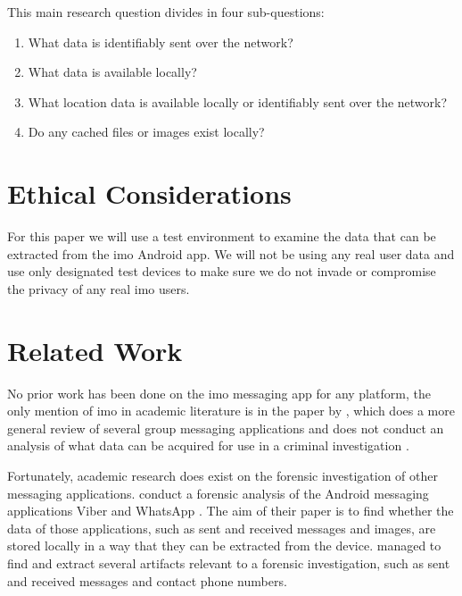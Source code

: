 \documentclass[conference]{IEEEtran}
\begin{document}
\vspace{0.1cm}

\noindent{} This main research question divides in four sub-questions:

\begin{enumerate}
    \item What data is identifiably sent over the network?
    \item What data is available locally?
    \item What location data is available locally or identifiably sent over the
        network?
    \item Do any cached files or images exist locally?
\end{enumerate}


\section{Ethical Considerations}\label{sec:ethics}

For this paper we will use a test environment to examine the data that can be
extracted from the imo Android app. We will not be using any real user data and
use only designated test devices to make sure we do not invade or compromise the
privacy of any real imo users.


\section{Related Work}\label{sec:relwork}

No prior work has been done on the imo messaging app for any platform, the only
mention of imo in academic literature is in the paper by \citeauthor{zhu}, which
does a more general review of several group messaging applications and does not
conduct an analysis of what data can be acquired for use in a criminal
investigation \cite{zhu}.

Fortunately, academic research does exist on the forensic investigation of other
messaging applications. \citeauthor{mahajan2013forensic} conduct a forensic
analysis of the Android messaging applications Viber and WhatsApp
\cite{mahajan2013forensic}. The aim of their paper is to find whether the data
of those applications, such as sent and received messages and images, are stored
locally in a way that they can be extracted from the device.
\citeauthor{mahajan2013forensic} managed to find and extract several artifacts
relevant to a forensic investigation, such as sent and received messages and
contact phone numbers.
\end{document}
